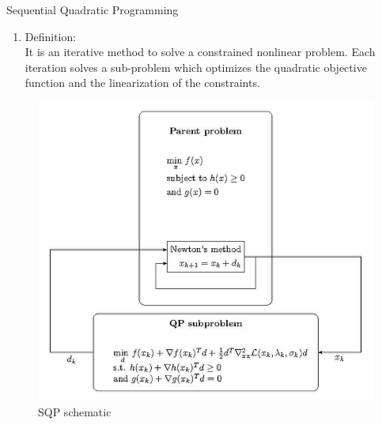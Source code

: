 \documentclass[10pt,compress]{beamer}
\begin{document}
\begin{frame}{Sequential Quadratic Programming}
\begin{enumerate}
\item Definition: \\
It is an iterative method to solve a constrained nonlinear problem. Each iteration solves a sub-problem which optimizes the quadratic objective function and the linearization of the constraints. 
\end{enumerate}

\begin{figure}
    \centering
    \includegraphics[height=.6\textheight]{images/SQP_schematic.pdf.jpg}
    \caption{SQP schematic}
    \label{fig:sqp-schematic}
\end{figure}

\end{frame}
\end{document}
